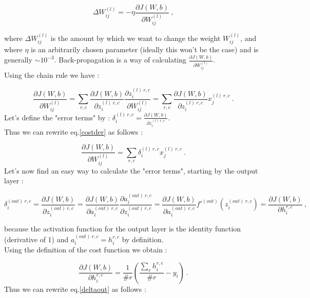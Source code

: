 \documentclass[a4paper,12pt,twoside]{article}
\begin{document}
\begin{equation}
\Delta W_{ij}^{(l)} = -\eta \frac{\partial J(W,b)}{\partial W_{ij}^{(l)}}~,
\label{graddescent}
\end{equation}

where $\Delta W_{ij}^{(l)}$ is the amount by which we want to change the weight $W_{ij}^{(l)}$, and where $\eta$ is an arbitrarily chosen parameter (ideally this won't be the case) and is generally $\sim 10^{-3}$. Back-propagation is a way of calculating $\frac{\partial J(W,b)}{\partial W_{ij}^{(l)}}$.\\
Using the chain rule we have :

\begin{equation}
\frac{\partial J(W,b)}{\partial W^{(l)}_{ij}} =\sum_{r,c} \frac{\partial J(W,b)}{\partial z^{(l)~r,c}_{i}} \frac{\partial z^{(l)~r,c}_{i}}{\partial W^{(l)}_{ij}} = \sum_{r,c} \frac{\partial J(W,b)}{\partial z^{(l)~r,c}_{i}}x_j^{(l)~r,c}~.
\label{costder}
\end{equation}
Let's define the "error terms" by : $\delta^{(l)~r,c}_i = \frac{\partial J(W,b)}{\partial z^{(l)~r,c}_i}$. \\
Thus we can rewrite eq.\ref{costder} as follows :

\begin{equation}
\frac{\partial J(W,b)}{\partial W^{(l)}_{ij}} =\sum_{r,c} \delta^{(l)~r,c}_i x_j^{(l)~r,c}~.
\end{equation}
Let's now find an easy way to calculate the "error terms", starting by the output layer : 

\begin{equation}
\delta^{(out)~r,c}_i  = \frac{\partial J(W,b)}{\partial z^{(out)~r,c}_i} = \frac{\partial J(W,b)}{\partial a^{(out)~r,c}_i} \frac{\partial a^{(out)~r,c}_i}{\partial z^{(out)~r,c}_i} = \frac{\partial J(W,b)}{\partial a^{(out)~r,c}_i} f'^{(out)}(z^{(out)~r,c}_i) = \frac{\partial J(W,b)}{\partial h^{r,c}_i}~,
\label{deltaout}
\end{equation}

because the activation function for the output layer is the identity function (derivative of 1) and $a^{(out)~r,c}_i = h^{r,c}_i$ by definition.\\
Using the definition of the cost function we obtain : 

\begin{equation}
\frac{\partial J(W,b)}{\partial h^{r,c}_i}  = \frac{1}{\# r}\left(\frac{\sum_r h_i^{r,c}}{\# r} - y_i \right)~.
\end{equation}
Thus we can rewrite eq.\ref{deltaout} as follows : 
\end{document}
